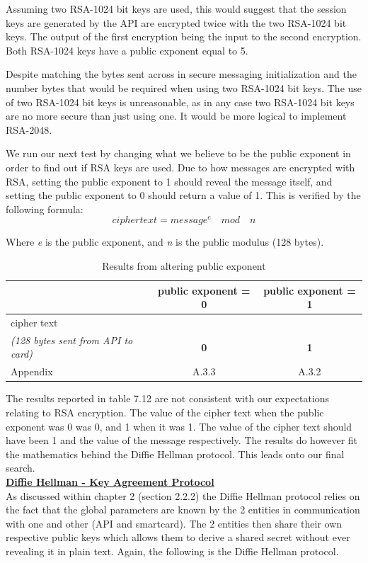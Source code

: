 \documentclass[bsc,frontabs,twoside,singlespacing,parskip,deptreport]{infthesis}     %
\begin{document}
Assuming two RSA-1024 bit keys are used, this would suggest that the session keys are generated by the API are encrypted twice with the two RSA-1024 bit keys. The output of the first encryption being the input to the second encryption. Both RSA-1024 keys have a public exponent equal to 5. 

Despite matching the bytes sent across in secure messaging initialization and the number bytes that would be required when using two RSA-1024 bit keys. The use of two RSA-1024 bit keys is unreasonable, as in any case two RSA-1024 bit keys are no more secure than just using one. It would be more logical to implement RSA-2048.


We run our next test by changing what we believe to be the public exponent in order to find out if RSA keys are used. Due to how messages are encrypted with RSA, setting the public exponent to 1 should reveal the message itself, and setting the public exponent to 0 should return a value of 1. This is verified by the following formula:\\

$$ ciphertext = message^{e} \quad mod \quad n $$

Where \textit{e} is the public exponent, and \textit{n} is the public modulus (128 bytes).\\


\begin{table}[H]
\begin{tabular}{|l|c|c|}
\hline
& public exponent = 0 & public exponent = 1\\
\hline
cipher text & &\\
\textit{(128 bytes sent from API to card)} & \textbf{0} & \textbf{1} \\

\hline
Appendix & A.3.3 & A.3.2 \\
\hline
\end{tabular}
\caption{Results from altering public exponent}
\end{table}

The results reported in table 7.12 are not consistent with our expectations relating to RSA encryption. The value of the cipher text when the public exponent was 0 was 0, and 1 when it was 1. The value of the cipher text should have been 1 and the value of the message respectively. The results do however fit the mathematics behind the Diffie Hellman protocol. This leads onto our final search.\\

\underline{\textbf{Diffie Hellman - Key Agreement Protocol}}\\
As discussed within chapter 2 (section 2.2.2) the Diffie Hellman protocol relies on the fact that the global parameters are known by the 2 entities in communication with one and other (API and smartcard). The 2 entities then share their own respective public keys which allows them to derive a shared secret without ever revealing it in plain text. Again, the following is the Diffie Hellman protocol.\\
\end{document}
